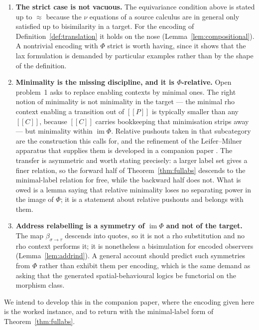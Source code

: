 \documentclass[11pt]{article}
\theoremstyle{definition}
\theoremstyle{plain}
\theoremstyle{remark}
\newcommand{\enc}[1]{[\![#1]\!]}
\begin{document}
\begin{enumerate}[label=(\roman*),leftmargin=2.2em]

\item \textbf{The strict case is not vacuous.} The equivariance
condition above is stated up to $\approx$ because the $\nu$ equations of
a source calculus are in general only satisfied up to bisimilarity in a
target. For the encoding of Definition~\ref{def:translation} it holds on
the nose (Lemma~\ref{lem:compositional}). A nontrivial encoding with
$\Phi$ strict is worth having, since it shows that the lax formulation is
demanded by particular examples rather than by the shape of the
definition.

\item \textbf{Minimality is the missing discipline, and it is
$\Phi$-relative.} Open problem~1 asks to replace enabling contexts by
minimal ones. The right notion of minimality is not minimality in the
target --- the minimal rho context enabling a transition out of $\enc{P}$
is typically smaller than any $\enc{C}$, because $\enc{C}$ carries
bookkeeping that minimisation strips away --- but minimality within
$\operatorname{im}\Phi$. Relative pushouts taken in that subcategory are
the construction this calls for, and the refinement of the
Leifer--Milner apparatus that supplies them is developed in a companion
paper \cite{BIHOL}. The transfer is asymmetric and worth stating
precisely: a larger label set gives a finer relation, so the forward
half of Theorem~\ref{thm:fullabs} descends to the minimal-label relation
for free, while the backward half does not. What is owed is a lemma
saying that relative minimality loses no separating power in the image of
$\Phi$; it is a statement about relative pushouts and belongs with them.

\item \textbf{Address relabelling is a symmetry of
$\operatorname{im}\Phi$ and not of the target.} The map
$\beta_{\sigma\to\tau}$ descends into quotes, so it is not a rho
substitution and no rho context performs it; it is nonetheless a
bisimulation for encoded observers (Lemma~\ref{lem:addrind}). A general
account should predict such symmetries from $\Phi$ rather than exhibit
them per encoding, which is the same demand as asking that the generated
spatial-behavioural logics be functorial on the morphism class.

\end{enumerate}

We intend to develop this in the companion paper, where the encoding
given here is the worked instance, and to return with the minimal-label
form of Theorem~\ref{thm:fullabs}.
\end{document}
